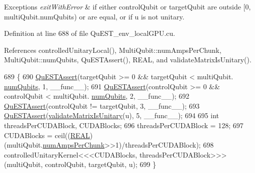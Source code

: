 \begin{DoxyExceptions}{Exceptions}
{\em exit\+With\+Error} & if either {\ttfamily control\+Qubit} or {\ttfamily target\+Qubit} are outside \mbox{[}0, {\ttfamily multi\+Qubit.\+num\+Qubits}) or are equal, or if {\ttfamily u} is not unitary. \\
\hline
\end{DoxyExceptions}


Definition at line 688 of file Qu\+E\+S\+T\+\_\+env\+\_\+local\+G\+P\+U.\+cu.



References controlled\+Unitary\+Local(), Multi\+Qubit\+::num\+Amps\+Per\+Chunk, Multi\+Qubit\+::num\+Qubits, Qu\+E\+S\+T\+Assert(), R\+E\+AL, and validate\+Matrix\+Is\+Unitary().


\begin{DoxyCode}
689 \{
690     \mbox{\hyperlink{QuEST__env__localGPU_8cu_a3587b9d533e633ccf1abf9ad2ce45d8d}{QuESTAssert}}(targetQubit >= 0 && targetQubit < multiQubit.
      \mbox{\hyperlink{structMultiQubit_ab5b9795bdc6fb5855e1974dcbbaeb36f}{numQubits}}, 1, \_\_func\_\_);
691     \mbox{\hyperlink{QuEST__env__localGPU_8cu_a3587b9d533e633ccf1abf9ad2ce45d8d}{QuESTAssert}}(controlQubit >= 0 && controlQubit < multiQubit.
      \mbox{\hyperlink{structMultiQubit_ab5b9795bdc6fb5855e1974dcbbaeb36f}{numQubits}}, 2, \_\_func\_\_);
692     \mbox{\hyperlink{QuEST__env__localGPU_8cu_a3587b9d533e633ccf1abf9ad2ce45d8d}{QuESTAssert}}(controlQubit != targetQubit, 3, \_\_func\_\_);
693     \mbox{\hyperlink{QuEST__env__localGPU_8cu_a3587b9d533e633ccf1abf9ad2ce45d8d}{QuESTAssert}}(\mbox{\hyperlink{QuEST_8c_ae4fea133d1a8f09ff8da03038100adb2}{validateMatrixIsUnitary}}(u), 5, \_\_func\_\_);
694 
695     \textcolor{keywordtype}{int} threadsPerCUDABlock, CUDABlocks;
696     threadsPerCUDABlock = 128;
697     CUDABlocks = ceil((\mbox{\hyperlink{QuEST__precision_8h_a4b654506f18b8bfd61ad2a29a7e38c25}{REAL}})(multiQubit.\mbox{\hyperlink{structMultiQubit_a1cad83601a78635dd278259c7ed54f18}{numAmpsPerChunk}}>>1)/threadsPerCUDABlock);
698     controlledUnitaryKernel<<<CUDABlocks, threadsPerCUDABlock>>>(multiQubit, controlQubit, targetQubit, u);
699 \}
\end{DoxyCode}
\mbox{\label{QuEST__env__localGPU_8cu_a8e75679cf6d66e11507ee227ab584473}} 
